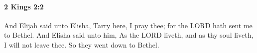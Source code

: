 
		\paragraph{2 Kings 2:2} %
			\label{2KINGS-2-2}

			And Elijah said unto Elisha, Tarry here, I pray thee; for the LORD hath sent me to Bethel. And Elisha said unto him, As the LORD liveth, and as thy soul liveth, I will not leave thee. So they went down to Bethel.


